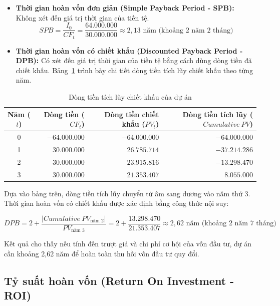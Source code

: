 \begin{itemize}
  \item \textbf{Thời gian hoàn vốn đơn giản (Simple Payback Period - SPB):}
  Không xét đến giá trị thời gian của tiền tệ.
  \[
  SPB = \frac{I_0}{CF_t} = \frac{64.000.000}{30.000.000} \approx 2{,}13 \text{ năm} \text{ (khoảng 2 năm 2 tháng)}
  \]
  
  \item \textbf{Thời gian hoàn vốn có chiết khấu (Discounted Payback Period - DPB):}
  Có xét đến giá trị thời gian của tiền tệ bằng cách dùng dòng tiền đã chiết khấu. Bảng~\ref{tab:discounted-cashflow-cum} trình bày chi tiết dòng tiền tích lũy chiết khấu theo từng năm.
\end{itemize}

\begin{table}[H]
\centering
\caption{Dòng tiền tích lũy chiết khấu của dự án}
\label{tab:discounted-cashflow-cum}
\begin{tabularx}{\textwidth}{| c | r | r | r |}
\hline
\textbf{Năm ($t$)} & \textbf{Dòng tiền ($CF_t$)} & \textbf{Dòng tiền chiết khấu ($PV_t$)} & \textbf{Dòng tiền tích lũy ($Cumulative\ PV$)} \\
\hline
0 & $-64.000.000$ & $-64.000.000$ & $-64.000.000$ \\ \hline
1 & $30.000.000$ & $26.785.714$ & $-37.214.286$ \\ \hline
2 & $30.000.000$ & $23.915.816$ & $-13.298.470$ \\ \hline
3 & $30.000.000$ & $21.353.407$ & $8.055.000$ \\
\hline
\end{tabularx}
\end{table}

Dựa vào bảng trên, dòng tiền tích lũy chuyển từ âm sang dương vào năm thứ 3. Thời gian hoàn vốn có chiết khấu được xác định bằng công thức nội suy:

\[
DPB = 2 + \frac{|Cumulative\ PV_{\text{năm 2}}|}{PV_{\text{năm 3}}} = 2 + \frac{13.298.470}{21.353.407} \approx 2{,}62 \text{ năm} \text{ (khoảng 2 năm 7 tháng)}
\]

Kết quả cho thấy nếu tính đến trượt giá và chi phí cơ hội của vốn đầu tư, dự án cần khoảng 2,62 năm để hoàn toàn thu hồi vốn đầu tư quy đổi.

\subsection{Tỷ suất hoàn vốn (Return On Investment - ROI)}

